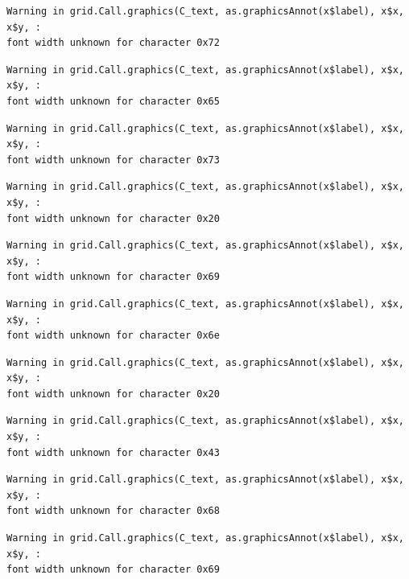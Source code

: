 \documentclass[
  letterpaper,
]{scrbook}
\begin{document}
\begin{verbatim}
Warning in grid.Call.graphics(C_text, as.graphicsAnnot(x$label), x$x, x$y, :
font width unknown for character 0x72
\end{verbatim}

\begin{verbatim}
Warning in grid.Call.graphics(C_text, as.graphicsAnnot(x$label), x$x, x$y, :
font width unknown for character 0x65
\end{verbatim}

\begin{verbatim}
Warning in grid.Call.graphics(C_text, as.graphicsAnnot(x$label), x$x, x$y, :
font width unknown for character 0x73
\end{verbatim}

\begin{verbatim}
Warning in grid.Call.graphics(C_text, as.graphicsAnnot(x$label), x$x, x$y, :
font width unknown for character 0x20
\end{verbatim}

\begin{verbatim}
Warning in grid.Call.graphics(C_text, as.graphicsAnnot(x$label), x$x, x$y, :
font width unknown for character 0x69
\end{verbatim}

\begin{verbatim}
Warning in grid.Call.graphics(C_text, as.graphicsAnnot(x$label), x$x, x$y, :
font width unknown for character 0x6e
\end{verbatim}

\begin{verbatim}
Warning in grid.Call.graphics(C_text, as.graphicsAnnot(x$label), x$x, x$y, :
font width unknown for character 0x20
\end{verbatim}

\begin{verbatim}
Warning in grid.Call.graphics(C_text, as.graphicsAnnot(x$label), x$x, x$y, :
font width unknown for character 0x43
\end{verbatim}

\begin{verbatim}
Warning in grid.Call.graphics(C_text, as.graphicsAnnot(x$label), x$x, x$y, :
font width unknown for character 0x68
\end{verbatim}

\begin{verbatim}
Warning in grid.Call.graphics(C_text, as.graphicsAnnot(x$label), x$x, x$y, :
font width unknown for character 0x69
\end{verbatim}
\end{document}
